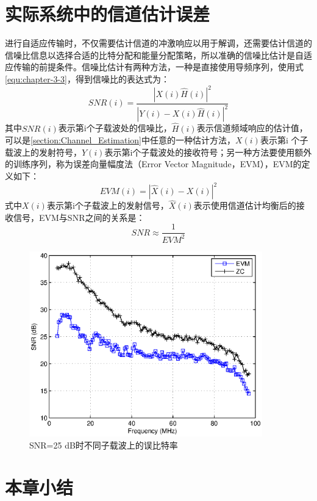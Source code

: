 \section{实际系统中的信道估计误差}
进行自适应传输时，不仅需要估计信道的冲激响应以用于解调，还需要估计信道的信噪比信息以选择合适的比特分配和能量分配策略，所以准确的信噪比估计是自适应传输的前提条件。信噪比估计有两种方法，一种是直接使用导频序列，使用式\ref{equ:chapter-3-3}，得到信噪比的表达式为：
\begin{equation}
SNR(i) = \frac{|X(i) \hat{H}(i)|^2}{|Y(i)-X(i) \hat{H}(i)|^2}
\end{equation}
其中$SNR(i)$表示第i个子载波处的信噪比，$\hat{H}(i)$表示信道频域响应的估计值，可以是\ref{section:Channel_Estimation}中任意的一种估计方法，$X(i)$表示第i 个子载波上的发射符号，$Y(i)$表示第i个子载波处的接收符号；另一种方法要使用额外的训练序列，称为误差向量幅度法（Error Vector Magnitude，EVM），EVM的定义如下：
\begin{equation}
EVM(i) = |\hat{X}(i)-X(i)|^2
\end{equation}
式中$X(i)$表示第i个子载波上的发射信号，$\hat{X}(i)$表示使用信道估计均衡后的接收信号，EVM与SNR之间的关系是\cite{shafik2006extended}：
\begin{equation}
SNR \approx \frac{1}{EVM^2}
\end{equation}

\begin{figure}[htbp]
\centering
\includegraphics[width=0.9\textwidth]{figures/chapter-3/SNR_ZC_EVM.eps}
\caption{SNR=25 dB时不同子载波上的误比特率}
\label{fig:BER_sc}
\end{figure}
\section{本章小结}
